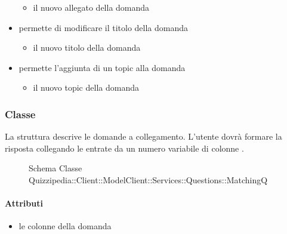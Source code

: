 \begin{itemize}
\begin{itemize}
\item {}
\newline
il nuovo allegato della domanda
\end{itemize}
\item {}
\newline
permette di modificare il titolo della domanda
\newline
{}
\newline
\begin{itemize}
\item {}
\newline
il nuovo titolo della domanda
\end{itemize}
\item {}
\newline
permette l'aggiunta di un topic alla domanda
\newline
{}
\newline
\begin{itemize}
\item {}
\newline
il nuovo topic della domanda
\end{itemize}
\end{itemize}
\subsubsection{Classe }
La struttura descrive le domande a collegamento. L'utente dovrà formare la risposta collegando le entrate da un numero variabile di colonne .
\begin{figure}[H]
\centering
\noindent{}
\caption[Schema Classe MatchingQ]{Schema Classe Quizzipedia::Client::ModelClient::Services::Questions::MatchingQ}
\end{figure}
\paragraph{Attributi}
\begin{itemize}
\item {}
\newline
le colonne della domanda
\end{itemize}

